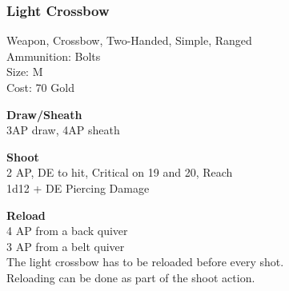 \subsubsection{Light Crossbow}\label{weapon:lightCrossbow}
Weapon, Crossbow, Two-Handed, Simple, Ranged\\
Ammunition: Bolts\\
Size: M\\
Cost: 70 Gold

\textbf{Draw/Sheath} \\
3AP draw, 4AP sheath

\textbf{Shoot} \\
2 AP, DE to hit, Critical on 19 and 20,  Reach\\
1d12 + \texttimes DE Piercing Damage

\textbf{Reload} \\
4 AP from a back quiver\\
3 AP from a belt quiver\\
The light crossbow has to be reloaded before every shot.\\
Reloading can be done as part of the shoot action.

